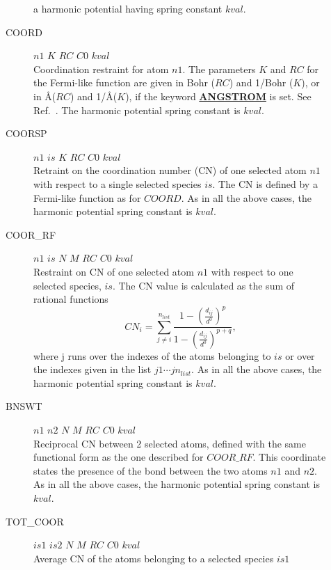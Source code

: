 \documentclass[twoside,10pt,titlepage,a4paper]{article}
\newcommand{\referto}[2]{\hyperlink{#1}{#2}}
\newcommand{\referto}[2]{\htmlref{#2}{#1}}
\newcommand{\refkeyword}[1]{%
\referto{#1}{\textbf{#1}}%
\index{#1}%
}%
\begin{document}
\begin{description}
\begin{description}
               a harmonic potential having spring constant $kval$.
             \item[COORD]  $n1$ $K$ $RC$ $C0$ $kval$ \hfill\\
              Coordination restraint for atom $n1$. The parameters $K$ and $RC$ for the
              Fermi-like function are given in Bohr ($RC$) and 1/Bohr ($K$), or in \AA  ($RC$) 
              and 1/\AA  ($K$), if the keyword \refkeyword{ANGSTROM} is set.
              See Ref.~\cite{Sprik98a}. The harmonic potential spring constant is $kval$.
             \item[COORSP] $n1$ $is$ $K$ $RC$ $C0$ $kval$ \hfill\\
              Retraint on the coordination number (CN) of one selected atom $n1$ with respect
              to a single selected species $is$. The CN is defined by a Fermi-like function 
              as for $COORD$. 
              As in all the above cases, the harmonic potential spring constant is $kval$.
             \item[COOR\_RF] $n1$ $is$ $N$ $M$ $RC$ $C0$ $kval$ \hfill\\
              Restraint on CN of one selected atom $n1$ with respect to one selected
              species, $is$. The CN value is calculated as the sum of rational functions
              \begin{equation}
              CN_i = \sum_{j \neq i}^{n_{list}} \frac{1-\left(\frac{d_{ij}}{d^0}\right)^{p}}
              {1-\left(\frac{d_{ij}}{d^0}\right)^{p+q}},
              \end{equation}
              where j runs over the indexes of the atoms belonging to $is$ or over the
              indexes given in the list $j1 \cdots jn_{list}$.
              As in all the above cases, the harmonic potential spring constant is $kval$.
             \item[BNSWT] $n1$ $n2$ $N$ $M$ $ RC$ $C0$ $kval$ \hfill\\
              Reciprocal CN between 2 selected atoms, defined with the same
              functional form as the one described for $COOR\_RF$.
              This coordinate states the presence of the bond between the
              two atoms $n1$ and $n2$.
              As in all the above cases, the harmonic potential spring constant is $kval$.
             \item[TOT\_COOR] $is1$ $is2$ $N$ $M$ $RC$ $C0$ $kval$ \hfill\\
              Average CN of the atoms belonging to a selected species $is1$

\end{description}
\end{description}
\end{document}

